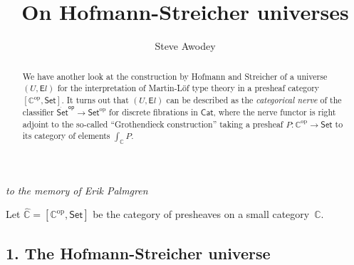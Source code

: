 \documentclass[11pt]{article}
\newcommand{\C}{\ensuremath{\mathbb{C}}}
\newcommand{\op}[1]{\ensuremath{{#1}^{\mathrm{op}}}}
\newcommand{\psh}[1]{\ensuremath{[\op{#1},\mathsf{Set}]}}
\newcommand{\Set}{\ensuremath{\mathsf{Set}}}
\newcommand{\Cat}{\ensuremath{\mathsf{Cat}}}
\renewcommand{\to}{\ensuremath{\rightarrow}}
\theoremstyle{remark}
\theoremstyle{definition}
\begin{document}

\title{On Hofmann-Streicher universes}
\author{Steve Awodey}
\maketitle

\centerline{\emph{to the memory of Erik Palmgren}}

\bigskip

\begin{abstract}
We have another look at the construction by Hofmann and Streicher of a universe $(U,{\mathsf{E}l})$ for the interpretation of Martin-L\"of type theory in a presheaf category $\psh{\C}$.  It turns out that $(U,{\mathsf{E}l})$ can be described as the \emph{categorical nerve} of the classifier $\dot{\Set}^{\mathsf{op}} \to \op{\Set}$ for discrete fibrations in $\Cat$, where the nerve functor is right adjoint to the so-called ``Grothendieck construction'' taking a presheaf $P : \op{\C}\to\Set$ to its category of elements $\int_\C P$.
\end{abstract}



\noindent Let $\widehat{\C} = \psh{\C}$ be the category of presheaves on a small category~$\C$.

\subsection*{1. The Hofmann-Streicher universe}\label{sec:U}
\end{document}
